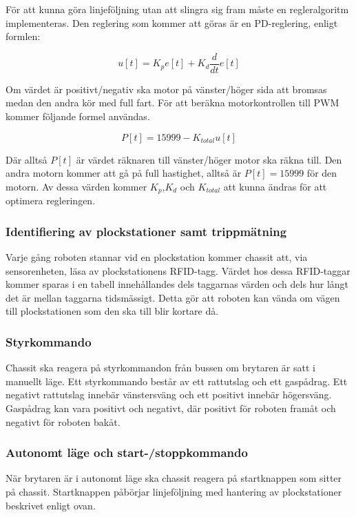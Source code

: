 För att kunna göra linjeföljning utan att slingra sig fram måste en regleralgoritm implementeras. Den reglering som kommer att göras är en PD-reglering, enligt formlen:

$$u[t] = K_{p}e[t] + K_{d}\frac{d}{dt}e[t]$$

Om värdet är positivt/negativ ska motor på vänster/höger sida att bromsas medan den andra kör med full fart. För att beräkna motorkontrollen till PWM kommer följande formel användas.

$$P[t] = 15999 - K_{total}u[t]$$

Där alltså $P[t]$ är värdet räknaren till vänster/höger motor ska räkna till. Den andra motorn kommer att gå på full hastighet, alltså är $P[t] = 15999$ för den motorn. Av dessa värden kommer $K_{p}$,$K_{d}$ och $K_{total}$ att kunna ändras för att optimera regleringen.


\subsubsection{Identifiering av plockstationer samt trippmätning}

Varje gång roboten stannar vid en plockstation kommer chassit att, via sensorenheten, läsa av plockstationens RFID-tagg. Värdet hos dessa RFID-taggar kommer sparas i en tabell innehållandes dels taggarnas värden och dels hur långt det är mellan taggarna tidsmässigt. Detta gör att roboten kan vända om vägen till plockstationen som den ska till blir kortare då.


\subsubsection{Styrkommando}

Chassit ska reagera på styrkommandon från bussen om brytaren är satt i manuellt läge. Ett styrkommando består av ett rattutslag och ett gaspådrag. Ett negativt rattutslag innebär vänstersväng och ett positivt innebär högersväng. Gaspådrag kan vara positivt och negativt, där positivt för roboten framåt och negativt för roboten bakåt. 


\subsubsection{Autonomt läge och start-/stoppkommando}

När brytaren är i autonomt läge ska chassit reagera på startknappen som sitter på chassit. Startknappen påbörjar linjeföljning med hantering av plockstationer beskrivet enligt ovan.

